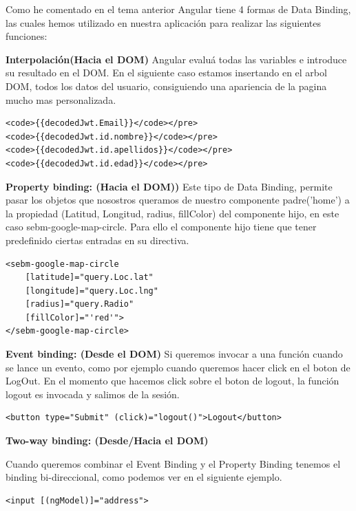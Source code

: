 Como he comentado en el tema anterior Angular tiene 4 formas de Data Binding, las cuales hemos utilizado en nuestra aplicación para realizar las siguientes funciones:

\item \textbf{Interpolación(Hacia el DOM)} Angular evaluá todas las variables e introduce su resultado en el DOM. En el siguiente caso estamos insertando en el arbol DOM, todos los datos del usuario, consiguiendo una apariencia de la pagina mucho mas personalizada.

\begin{lstlisting}
<code>{{decodedJwt.Email}}</code></pre>
<code>{{decodedJwt.id.nombre}}</code></pre>
<code>{{decodedJwt.id.apellidos}}</code></pre>
<code>{{decodedJwt.id.edad}}</code></pre>
\end{lstlisting}

\item \textbf{Property binding: (Hacia el DOM))} Este tipo de Data Binding, permite pasar los objetos que nosostros queramos de nuestro componente padre('home') a la propiedad (Latitud, Longitud, radius, fillColor) del componente hijo, en este caso sebm-google-map-circle. Para ello el componente hijo tiene que tener predefinido ciertas entradas en su directiva.

\begin{lstlisting}
<sebm-google-map-circle 
    [latitude]="query.Loc.lat" 
    [longitude]="query.Loc.lng"
    [radius]="query.Radio"
    [fillColor]="'red'">
</sebm-google-map-circle>
\end{lstlisting}

\item \textbf{Event binding: (Desde el DOM)}
Si queremos invocar a una función cuando se lance un evento, como por ejemplo cuando queremos hacer click en el boton de LogOut. En el momento que hacemos click sobre el boton de logout, la función logout es invocada y salimos de la sesión.

\begin{lstlisting}
<button type="Submit" (click)="logout()">Logout</button>
\end{lstlisting}

\item \textbf{Two-way binding: (Desde/Hacia el DOM)}

Cuando queremos combinar el Event Binding y el Property Binding tenemos el binding bi-direccional, como podemos ver en el siguiente ejemplo.

\begin{lstlisting}
<input [(ngModel)]="address">
\end{lstlisting}


